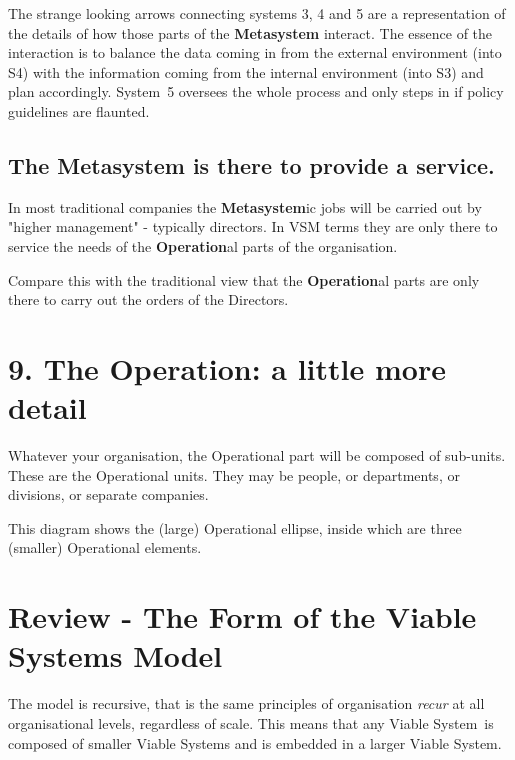 The strange looking arrows connecting systems 3, 4 and 5 are a representation of the details of how those parts of the \textcolor{M}{\textbf{Metasystem}} interact. The essence of the interaction is to balance the data coming in from the external environment (into S4) with the information coming from the internal environment (into S3) and plan accordingly. System 5 oversees the whole process and only steps in if policy guidelines are flaunted.

\subsection*{The \textcolor{M}{\textbf{Metasystem}} is there to provide a service.}
In most traditional companies the \textcolor{M}{\textbf{Metasystem}}ic jobs will be carried out by "higher management" - typically directors. In VSM terms they are only there to service the needs of the \textcolor{O}{\textbf{Operation}}al parts of the organisation.

Compare this with the traditional view that the \textcolor{O}{\textbf{Operation}}al parts are only there to carry out the orders of the Directors.

\section*{9. The \textcolor{O}{\textbf{Operation}}: a little more detail}
Whatever your organisation, the Operational part will be composed of sub-units. These are the Operational units. They may be people, or departments, or divisions, or separate companies.

This diagram shows the (large) Operational ellipse, inside which are three (smaller) Operational elements.


\section*{Review - The Form of the Viable Systems Model}
The model is recursive, that is the same principles of organisation \textit{recur} at all organisational levels, regardless of scale. This means that any Viable System is composed of smaller Viable Systems and is embedded in a larger Viable System.
